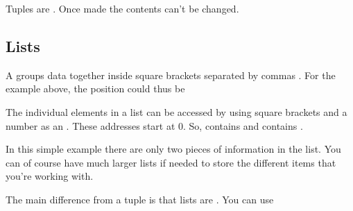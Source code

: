 \documentclass[letterpaper,10pt,british]{sphinxmanual}
\begin{document}
\sphinxAtStartPar
Tuples are . Once made the contents can’t be changed.


\subsection{Lists}
\label{\detokenize{chapters/programming_fundamentals/variables:lists}}\label{\detokenize{chapters/programming_fundamentals/variables:id3}}
\sphinxAtStartPar
A  groups data together inside square brackets  separated by commas . For the example above, the position could thus be

\begin{sphinxVerbatim}[commandchars=\\\{\}]
  \PYG{p}{[} \PYG{p}{]}
\end{sphinxVerbatim}

\sphinxAtStartPar
The individual elements in a list can be accessed by using square brackets  and a number as an . These addresses start at 0. So,  contains  and  contains .

\sphinxAtStartPar
In this simple example there are only two pieces of information in the list. You can of course have much larger lists if needed to store the different items that you’re working with.

\sphinxAtStartPar
The main difference from a tuple is that lists are . You can use

\begin{sphinxVerbatim}[commandchars=\\\{\}]
\PYG{p}{[}\PYG{p}{]}  
\PYG{p}{[}\PYG{p}{]}  
\end{sphinxVerbatim}
\end{document}
